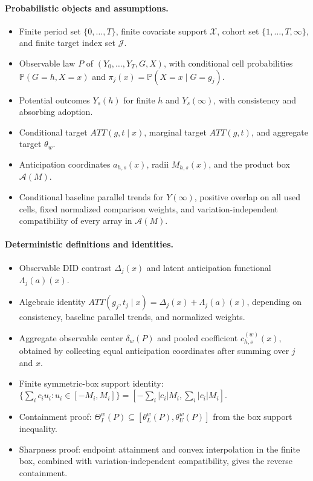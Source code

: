 \documentclass[11pt]{article}
\renewcommand{\Pr}{\mathbb{P}}
\theoremstyle{definition}
\theoremstyle{plain}
\theoremstyle{remark}
\begin{document}
\paragraph{Probabilistic objects and assumptions.}
\begin{itemize}[leftmargin=*]
  \item Finite period set \(\{0,\ldots,T\}\), finite covariate support
  \(\mathcal{X}\), cohort set \(\{1,\ldots,T,\infty\}\), and finite target index
  set \(\mathcal{J}\).
  \item Observable law \(P\) of \((Y_0,\ldots,Y_T,G,X)\), with conditional cell
  probabilities \(\Pr(G=h,X=x)\) and \(\pi_j(x)=\Pr(X=x\mid G=g_j)\).
  \item Potential outcomes \(Y_s(h)\) for finite \(h\) and \(Y_s(\infty)\), with
  consistency and absorbing adoption.
  \item Conditional target \(ATT(g,t\mid x)\), marginal target \(ATT(g,t)\), and
  aggregate target \(\theta_w\).
  \item Anticipation coordinates \(a_{h,s}(x)\), radii \(M_{h,s}(x)\), and the
  product box \(\mathcal{A}(M)\).
  \item Conditional baseline parallel trends for \(Y(\infty)\), positive overlap
  on all used cells, fixed normalized comparison weights, and
  variation-independent compatibility of every array in \(\mathcal{A}(M)\).
\end{itemize}

\paragraph{Deterministic definitions and identities.}
\begin{itemize}[leftmargin=*]
  \item Observable DID contrast \(\Delta_j(x)\) and latent anticipation
  functional \(\Lambda_j(a)(x)\).
  \item Algebraic identity
  \(ATT(g_j,t_j\mid x)=\Delta_j(x)+\Lambda_j(a)(x)\), depending on consistency,
  baseline parallel trends, and normalized weights.
  \item Aggregate observable center \(\delta_w(P)\) and pooled coefficient
  \(c^{(w)}_{h,s}(x)\), obtained by collecting equal anticipation coordinates
  after summing over \(j\) and \(x\).
  \item Finite symmetric-box support identity:
  \(\{\sum_i c_i u_i:u_i\in[-M_i,M_i]\}
    =[-\sum_i|c_i|M_i,\sum_i|c_i|M_i]\).
  \item Containment proof:
  \(\Theta_I^w(P)\subseteq[\theta_L^w(P),\theta_U^w(P)]\) from the box support
  inequality.
  \item Sharpness proof: endpoint attainment and convex interpolation in the
  finite box, combined with variation-independent compatibility, gives the
  reverse containment.
\end{itemize}
\end{document}
